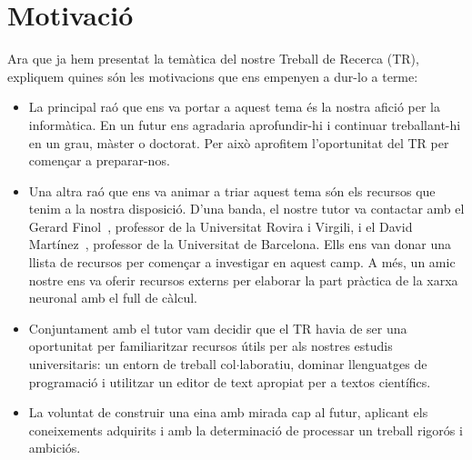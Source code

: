 \section{Motivació}
\vspace{-0.3truecm}
Ara que ja hem presentat la temàtica del nostre Treball de Recerca (TR), expliquem quines són les motivacions que ens empenyen a dur-lo a terme:
\vspace{-0.1truecm}
\begin{itemize}
\item La principal raó que ens va portar a aquest tema és la nostra afició per la informàtica. En un futur ens agradaria aprofundir-hi i continuar treballant-hi en un grau, màster o doctorat. Per això aprofitem l’oportunitat del TR per començar a preparar-nos.

\item Una altra raó que ens va animar a triar aquest tema són els recursos que tenim a la nostra disposició. D'una banda, el nostre tutor va contactar amb el Gerard Finol~\cite{gerard}, professor de la Universitat Rovira i Virgili, i el David Martínez~\cite{david}, professor de la Universitat de Barcelona. Ells ens van donar una llista de recursos per començar a investigar en aquest camp. A més, un amic nostre ens va oferir recursos externs per elaborar la part pràctica de la xarxa neuronal amb el full de càlcul.

\item Conjuntament amb el tutor vam decidir que el TR havia de ser una oportunitat per familiaritzar recursos útils per als nostres estudis universitaris: un entorn de treball col$\cdot$laboratiu, dominar llenguatges de programació i utilitzar un editor de text apropiat per a textos científics.

\item La voluntat de construir una eina amb mirada cap al futur, aplicant els coneixements adquirits i amb la determinació de processar un treball rigorós i ambiciós.
\end{itemize}
\vspace{-0.6truecm}
